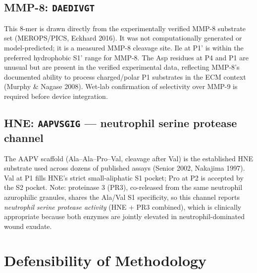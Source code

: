 \documentclass[10pt,a4paper]{article}
\newcommand{\seq}[1]{\texttt{#1}}
\begin{document}
\subsection{MMP-8: \seq{DAEDIVGT}}
This 8-mer is drawn directly from the experimentally verified MMP-8
substrate set (MEROPS/PICS, Eckhard 2016).  It was not computationally
generated or model-predicted; it is a measured MMP-8 cleavage site.
Ile at P1' is within the preferred hydrophobic S1' range for MMP-8.
The Asp residues at P4 and P1 are unusual but are present in the
verified experimental data, reflecting MMP-8's documented ability to
process charged/polar P1 substrates in the ECM context (Murphy \&
Nagase 2008).  Wet-lab confirmation of selectivity over MMP-9 is
required before device integration.

\subsection{HNE: \seq{AAPVSGIG} --- neutrophil serine protease channel}
The AAPV scaffold (Ala--Ala--Pro--Val, cleavage after Val) is the
established HNE substrate used across dozens of published assays
(Senior 2002, Nakajima 1997).  Val at P1 fills HNE's strict small-aliphatic
S1 pocket; Pro at P2 is accepted by the S2 pocket.  Note: proteinase 3
(PR3), co-released from the same neutrophil azurophilic granules, shares
the Ala/Val S1 specificity, so this channel reports \emph{neutrophil serine
protease activity} (HNE $+$ PR3 combined), which is clinically appropriate
because both enzymes are jointly elevated in neutrophil-dominated wound
exudate.

\section{Defensibility of Methodology}
\end{document}
